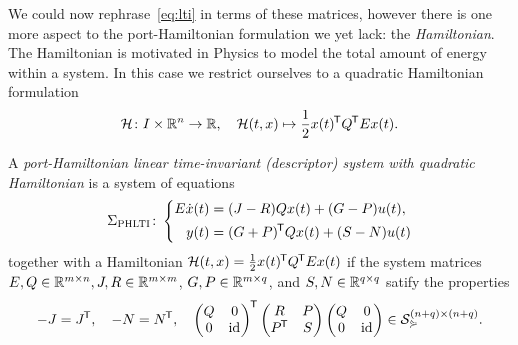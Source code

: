 We could now rephrase~\eqref{eq:lti} in terms of these matrices, however there is one more aspect to the port-Hamiltonian formulation we yet lack: the \emph{Hamiltonian}.
The Hamiltonian is motivated in Physics to model the total amount of energy within a system.
In this case we restrict ourselves to a quadratic Hamiltonian formulation
\begin{equation}\label{eq:quadratic-hamiltonian}
    \mathcal{H} \colon I \times \mathbb{R}^{n} \to \mathbb{R},\quad \mathcal{H}(t, x) \mapsto \frac{1}{2} x(t)^{\mkern-1.5mu \mathsf{T}} Q^{\mkern-1.5mu \mathsf{T}} E x(t).
\end{equation}

\begin{definition}\label{def:phlti}
    A \emph{port-Hamiltonian linear time-invariant (descriptor) system with quadratic Hamiltonian} is a system of equations
    \begin{equation}\label{eq:phlti}
        \Sigma_{\textsc{PHLTI}} \colon \left\lbrace
        \begin{aligned}
            E \dot{x}(t) &= (J - R) Q x(t) + (G - P) u(t), \\
            y(t) &= (G + P)^{\mkern-1.5mu \mathsf{T}} Q x(t) + (S - N) u(t)
        \end{aligned}
        \right.
    \end{equation}
    together with a Hamiltonian $\mathcal{H}(t, x) = \frac{1}{2} x(t)^{\mkern-1.5mu \mathsf{T}} Q^{\mkern-1.5mu \mathsf{T}} E x(t)$ if the system matrices $E, Q \in \mathbb{R}^{m \times n}, J, R \in \mathbb{R}^{m \times m}$, $G, P \in \mathbb{R}^{m \times q}$, and $S, N \in \mathbb{R}^{q \times q}$ satify the properties
    \begin{equation*}
        -J = J^{\mkern-1.5mu \mathsf{T}},\quad -N = N^{\mkern-1.5mu \mathsf{T}},\quad
        \begin{pmatrix}
            Q & 0 \\
            0 & \text{id}_{}
        \end{pmatrix}^{\mkern-1.5mu \mathsf{T}}
        \begin{pmatrix}
            R & P \\
            P^{\mkern-1.5mu \mathsf{T}} & S
        \end{pmatrix}
        \begin{pmatrix}
            Q & 0 \\
            0 & \text{id}_{}
        \end{pmatrix}
        \in \mathcal{S}_{\curlyeqsucc}^{(n + q) \times (n + q)}.
    \end{equation*}
\end{definition}


